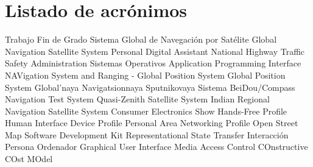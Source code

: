 \chapter{Listado de acrónimos}

{\small
\begin{acronym}[XXXXXXXX]
       {Trabajo Fin de Grado}
      {Sistema Global de Navegación por Satélite}
      {Global Navigation Satellite System}
       {Personal Digital Assistant}
     {National Highway Traffic Safety Administration}
        {Sistemas Operativos}
       {Application Programming Interface}
   {NAVigation System and Ranging - Global Position System}
       {Global Position System}
   {Global'naya Navigatsionnaya Sputnikovaya Sistema}
      {BeiDou/Compass Navigation Test System}
      {Quasi-Zenith Satellite System} 
     {Indian Regional Navigation Satellite System}
       {Consumer Electronics Show}
       {Hands-Free Profile}
       {Human Interface Device Profile}
       {Personal Area Networking Profile}
       {Open Street Map}
       {Software Development Kit}
      {Representational State Transfer}
       {Interacción Persona Ordenador}
       {Graphical User Interface}
       {Media Access Control}
    {COnstructive COst MOdel}
\end{acronym}
}




